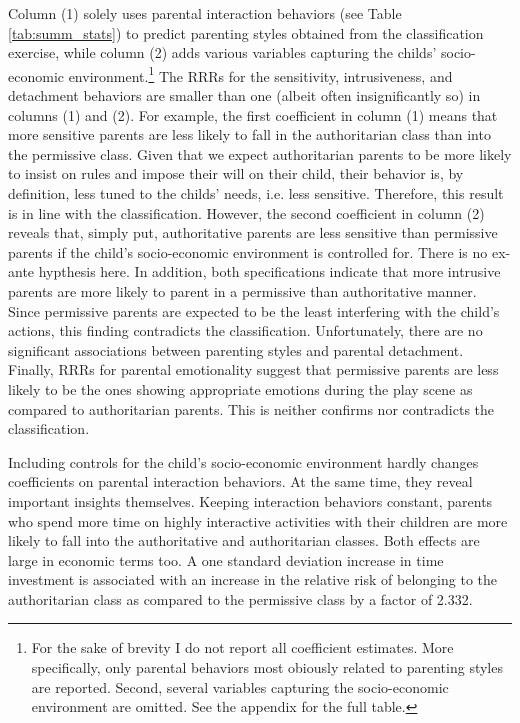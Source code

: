 %
Column (1) solely uses parental interaction behaviors (see Table \ref{tab:summ_stats}) to predict parenting styles obtained from the classification exercise, while column (2) adds various variables capturing the childs' socio-economic environment.\footnote{
For the sake of brevity I do not report all coefficient estimates. More specifically, only parental behaviors most obiously related to parenting styles are reported. Second, several variables capturing the socio-economic environment are omitted. See the appendix for the full table.
} 
The RRRs for the sensitivity, intrusiveness, and detachment behaviors are smaller than one (albeit often insignificantly so) in columns (1) and (2). For example, the first coefficient in column (1) means that more sensitive parents are less likely to fall in the authoritarian class than into the permissive class. Given that we expect authoritarian parents to be more likely to insist on rules and impose their will on their child, their behavior is, by definition, less tuned to the childs' needs, i.e. less sensitive. Therefore, this result is in line with the classification. However, the second coefficient in column (2) reveals that, simply put, authoritative parents are less sensitive than permissive parents if the child's socio-economic environment is controlled for. There is no ex-ante hypthesis here.
%
In addition, both specifications indicate that more intrusive parents are more likely to parent in a permissive than authoritative manner. Since permissive parents are expected to be the least interfering with the child's actions, this finding contradicts the classification. Unfortunately, there are no significant associations between parenting styles and parental detachment. Finally, RRRs for parental emotionality suggest that permissive parents are less likely to be the ones showing appropriate emotions during the play scene as compared to authoritarian parents. This is neither confirms nor contradicts the classification.

Including controls for the child's socio-economic environment hardly changes coefficients on parental interaction behaviors. At the same time, they reveal important insights themselves. Keeping interaction behaviors constant, parents who spend more time on highly interactive activities with their children are more likely to fall into the authoritative and authoritarian classes. Both effects are large in economic terms too. A one standard deviation increase in time investment is associated with an increase in the relative risk of belonging to the authoritarian class as compared to the permissive class by a factor of 2.332.

